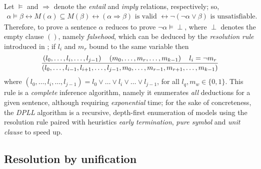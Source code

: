 \documentclass[a4paper,12pt]{article}
\begin{document}
Let $\models$ and $\Rightarrow$ denote the \textit{entail} and \textit{imply}
relations, respectively; so,
\begin{displaymath}
\begin{split}
\alpha \models \beta \leftrightarrow
M(\alpha) \subseteq M(\beta) \leftrightarrow
(\alpha \Rightarrow \beta) \text{ is valid } \leftrightarrow
\neg(\neg\alpha \vee \beta) \text{ is unsatisfiable.}
\end{split}
\end{displaymath}
Therefore, to prove a sentence $\alpha$ reduces to prove
$\neg\alpha\models\perp$, where $\perp$ denotes the empty clause $()$, namely
\textit{falsehood}, which can be deduced by the \textit{resolution rule}
introduced in \citep{Robinson:1965:MLB:321250.321253}; if $l_{i}$ and $m_{r}$
bound to the same variable then
\begin{displaymath}
{\left(l_{0}, \ldots, l_{i}, \ldots, l_{j-1}\right) \quad \left(m_{0}, \ldots, m_{r},\ldots, m_{k-1}\right) \quad l_{i} = \neg m_{r}
\over
\left(l_{0},\ldots, l_{i-1},l_{i+1}, \ldots,l_{j-1}, m_{0},\ldots, m_{r-1},m_{r+1},\ldots, m_{k-1}\right)}
\end{displaymath}
where $\left(l_{0},\ldots, l_{i}, \ldots, l_{j-1}\right) = l_{0}\vee \ldots
\vee l_{i} \vee \ldots \vee l_{j-1}$, for all $l_{q}, m_{w} \in\lbrace 0,1\rbrace$.
This rule is a \textit{complete} inference algorithm, namely it enumerates
\emph{all} deductions for a given sentence, although requiring
\emph{exponential} time; for the sake of concreteness, the \textit{DPLL}
algorithm \citep{Davis:1962:MPT:368273.368557}
is a recursive, depth-first enumeration of models using the
resolution rule paired with heuristics \textit{early termination},
\textit{pure symbol} and \textit{unit clause} to speed up.

\subsection{Resolution by unification}
\end{document}
